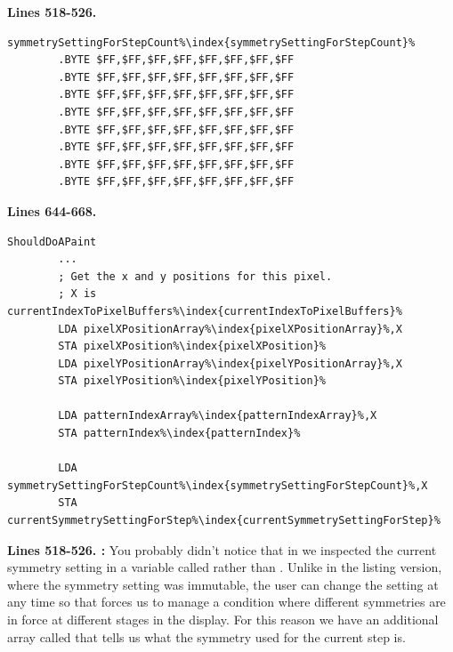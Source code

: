 \clearpage
\textbf{Lines 518-526. }
\begin{lstlisting}[escapechar=\%]
symmetrySettingForStepCount%\index{symmetrySettingForStepCount}%
        .BYTE $FF,$FF,$FF,$FF,$FF,$FF,$FF,$FF
        .BYTE $FF,$FF,$FF,$FF,$FF,$FF,$FF,$FF
        .BYTE $FF,$FF,$FF,$FF,$FF,$FF,$FF,$FF
        .BYTE $FF,$FF,$FF,$FF,$FF,$FF,$FF,$FF
        .BYTE $FF,$FF,$FF,$FF,$FF,$FF,$FF,$FF
        .BYTE $FF,$FF,$FF,$FF,$FF,$FF,$FF,$FF
        .BYTE $FF,$FF,$FF,$FF,$FF,$FF,$FF,$FF
        .BYTE $FF,$FF,$FF,$FF,$FF,$FF,$FF,$FF
\end{lstlisting}
\textbf{Lines 644-668. }
\begin{lstlisting}[escapechar=\%]
ShouldDoAPaint   
        ...
        ; Get the x and y positions for this pixel.
        ; X is currentIndexToPixelBuffers%\index{currentIndexToPixelBuffers}%
        LDA pixelXPositionArray%\index{pixelXPositionArray}%,X
        STA pixelXPosition%\index{pixelXPosition}%
        LDA pixelYPositionArray%\index{pixelYPositionArray}%,X
        STA pixelYPosition%\index{pixelYPosition}%

        LDA patternIndexArray%\index{patternIndexArray}%,X
        STA patternIndex%\index{patternIndex}%

        LDA symmetrySettingForStepCount%\index{symmetrySettingForStepCount}%,X
        STA currentSymmetrySettingForStep%\index{currentSymmetrySettingForStep}%
\end{lstlisting}
\clearpage

\textbf{Lines 518-526. :} You probably didn't notice that in 
we inspected the current symmetry setting in a variable called  rather than .
Unlike in the listing version, where the symmetry setting was immutable, the user can change the setting at any time so that forces us to
manage a condition where different symmetries are in force at different stages in the display. For this reason we have an additional array
called  that tells us what the symmetry used for the current step is.  

